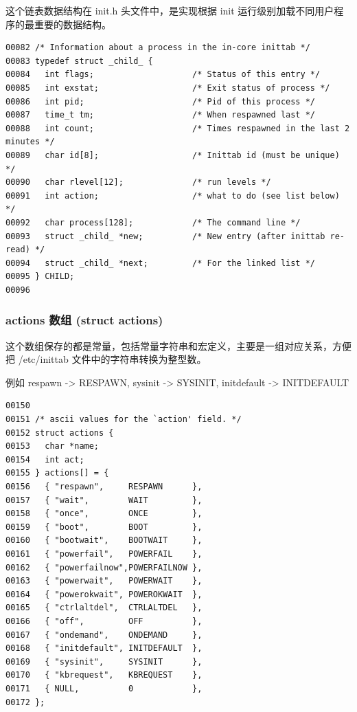 这个链表数据结构在 init.h 头文件中，是实现根据 init
运行级别加载不同用户程序的最重要的数据结构。

{\begin{shaded}\begin{verbatim}
00082 /* Information about a process in the in-core inittab */
00083 typedef struct _child_ {
00084   int flags;                    /* Status of this entry */
00085   int exstat;                   /* Exit status of process */
00086   int pid;                      /* Pid of this process */
00087   time_t tm;                    /* When respawned last */
00088   int count;                    /* Times respawned in the last 2 minutes */
00089   char id[8];                   /* Inittab id (must be unique) */
00090   char rlevel[12];              /* run levels */
00091   int action;                   /* what to do (see list below) */
00092   char process[128];            /* The command line */
00093   struct _child_ *new;          /* New entry (after inittab re-read) */
00094   struct _child_ *next;         /* For the linked list */
00095 } CHILD;
00096 
\end{verbatim}\end{shaded}}
\subsubsection{actions 数组 (struct actions)}

这个数组保存的都是常量，包括常量字符串和宏定义，主要是一组对应关系，方便把
/etc/inittab 文件中的字符串转换为整型数。

例如 respawn -\textgreater{} RESPAWN, sysinit -\textgreater{} SYSINIT,
initdefault -\textgreater{} INITDEFAULT

{\begin{shaded}\begin{verbatim}
00150 
00151 /* ascii values for the `action' field. */
00152 struct actions {
00153   char *name;
00154   int act;
00155 } actions[] = {
00156   { "respawn",     RESPAWN      },
00157   { "wait",        WAIT         },
00158   { "once",        ONCE         },
00159   { "boot",        BOOT         },
00160   { "bootwait",    BOOTWAIT     },
00161   { "powerfail",   POWERFAIL    },
00162   { "powerfailnow",POWERFAILNOW },
00163   { "powerwait",   POWERWAIT    },
00164   { "powerokwait", POWEROKWAIT  },
00165   { "ctrlaltdel",  CTRLALTDEL   },
00166   { "off",         OFF          },
00167   { "ondemand",    ONDEMAND     },
00168   { "initdefault", INITDEFAULT  },
00169   { "sysinit",     SYSINIT      },
00170   { "kbrequest",   KBREQUEST    },
00171   { NULL,          0            },
00172 };
\end{verbatim}\end{shaded}}
